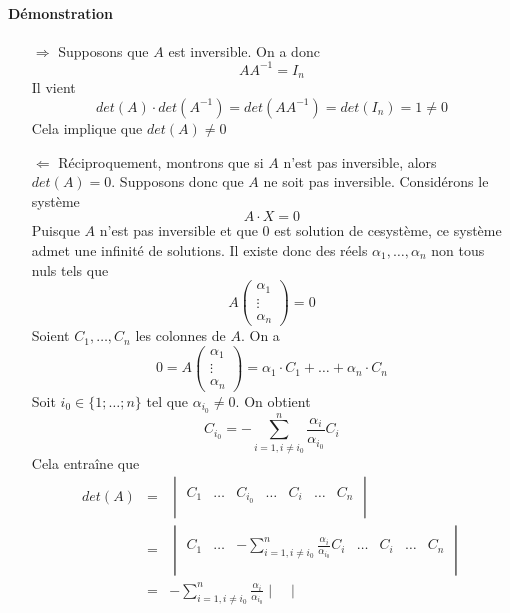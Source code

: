 \paragraph{Démonstration} 
\begin{itemize}
  \item [$\Rightarrow$] Supposons que $A$ est inversible. On a donc
    $$A A^{-1} = I_n$$
    Il vient
    $$det(A) \cdot det(A^{-1}) = det(AA^{-1}) = det(I_n) = 1 \neq 0$$
    Cela implique que $det(A) \neq 0$
  
  \item [$\Leftarrow$] Réciproquement, montrons que si $A$ n'est pas inversible, alors $det(A) = 0$. Supposons donc que $A$ ne soit pas inversible. Considérons le système 
    $$A \cdot X = 0$$
    Puisque $A$ n'est pas inversible et que $0$ est solution de cesystème, ce système admet une infinité de solutions. Il existe donc des réels $\alpha_1, \ldots, \alpha_n$ non tous nuls tels que
    $$A \begin{pmatrix} \alpha_1 \\ \vdots \\ \alpha_n \end{pmatrix} = 0$$
    Soient $C_1, \ldots, C_n$ les colonnes de $A$. On a 
    $$0 = A \begin{pmatrix} \alpha_1 \\ \vdots \\ \alpha_n \end{pmatrix} = \alpha_1 \cdot C_1 + \ldots + \alpha_n \cdot C_n$$
    Soit $i_0 \in \{1; \ldots; n \}$ tel que $\alpha_{i_0} \neq 0$. On obtient 
    $$C_{i_0} = - \sum_{i=1, i\neq i_0}^n \frac{\alpha_i}{\alpha_{i_0}} C_i$$
    Cela entraîne que
    \begin{eqnarray*}
      det(A) &=& \begin{vmatrix} \\
        C_1 & \ldots & C_{i_0} & \ldots & C_i & \ldots & C_n 
      \\ \\ \end{vmatrix} \\
        &=& \begin{vmatrix} \\
          C_1 & \ldots & - \sum_{i=1, i\neq i_0}^n \frac{\alpha_i}{\alpha_{i_0}} C_i & \ldots & C_i & \ldots & C_n 
        \\ \\\end{vmatrix} \\
        &=& - \sum_{i=1, i\neq i_0}^n \frac{\alpha_i}{\alpha_{i_0}} \begin{vmatrix} \\

\end{vmatrix}
\end{eqnarray*}
\end{itemize}
